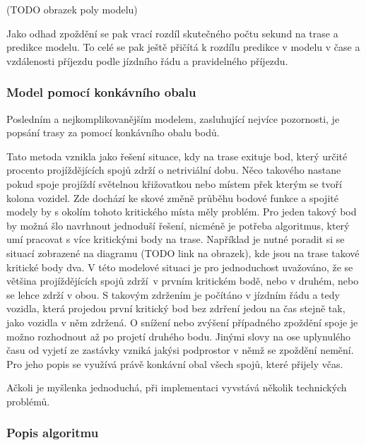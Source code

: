 (TODO obrazek poly modelu)

\bigbreak

Jako odhad zpoždění se pak vrací rozdíl skutečného počtu sekund na trase a predikce modelu. To celé se pak ještě přičítá k rozdílu predikce v modelu v čase a vzdálenosti příjezdu podle jízdního řádu a pravidelného příjezdu.


\subsubsection{Model pomocí konkávního obalu}

Posledním a nejkomplikovanějším modelem, zasluhující nejvíce pozornosti, je popsání trasy za pomocí konkávního obalu bodů.

\bigbreak

Tato metoda vznikla jako řešení situace, kdy na trase exituje bod, který určité procento projíždějících spojů zdrží o netriviální dobu. Něco takového nastane pokud spoje projíždí světelnou křižovatkou nebo místem přek kterým se tvoří kolona vozidel. Zde dochází ke skové změně průběhu bodové funkce a spojité modely by s okolím tohoto kritického místa měly problém. Pro jeden takový bod by možná šlo navrhnout jednoduší řešení, nicméně je potřeba algoritmus, který umí pracovat s více kritickými body na trase. Například je nutné poradit si se situací zobrazené na diagramu (TODO link na obrazek), kde jsou na trase takové kritické body dva. V této modelové situaci je pro jednoduchost uvažováno, že se většina projíždějících spojů zdrží v prvním kritickém bodě, nebo v druhém, nebo se lehce zdrží v obou. S takovým zdržením je počítáno v jízdním řádu a tedy vozidla, která projedou první kritický bod bez zdrření jedou na čas stejně tak, jako vozidla v něm zdržená. O snížení nebo zvýšení případného zpoždění spoje je možno rozhodnout až po projetí druhého bodu. Jinými slovy na ose uplynulého času od vyjetí ze zastávky vzniká jakýsi podprostor v němž se zpoždění nemění. Pro jeho popis se využívá právě konkávní obal všech spojů, které přijely včas.



Ačkoli je myšlenka jednoduchá, při implementaci vyvstává několik technických problémů.

\bigbreak




\subsubsection{Popis algoritmu}

